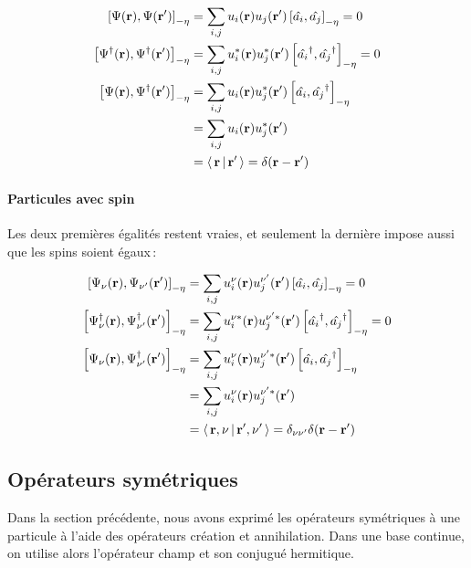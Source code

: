             \begin{align*}
                \left[\Psi(\mathbf{r}), \Psi(\mathbf{r}')\right]_{- \eta} 
                &= \sum_{i,j} u_i(\mathbf{r}) u_j(\mathbf{r}') \left[\hat{a_i}, \hat{a_j}\right]_{- \eta} = 0 \\
                \left[\Psi^{\dagger}(\mathbf{r}), \Psi^{\dagger}(\mathbf{r}')\right]_{- \eta} 
                &= \sum_{i,j} u_i^*(\mathbf{r}) u_j^*(\mathbf{r}') \left[\hat{a_i}^{\dagger}, \hat{a_j}^{\dagger}\right]_{- \eta} = 0 \\ 
                \left[\Psi(\mathbf{r}), \Psi^{\dagger}(\mathbf{r}')\right]_{- \eta} 
                &= \sum_{i,j} u_i(\mathbf{r}) u_j^*(\mathbf{r}') \left[\hat{a_i}, \hat{a_j}^{\dagger}\right]_{- \eta} \\ 
                &= \sum_{i,j} u_i(\mathbf{r}) u_j^*(\mathbf{r}') \\
                &= \left< \, \mathbf{r} \, \middle| \, \mathbf{r}' \, \right> = \delta(\mathbf{r} - \mathbf{r}') \\
            \end{align*}

            \paragraph{Particules avec spin}

            Les deux premières égalités restent vraies, et seulement la dernière impose aussi que les spins soient égaux :

            \begin{align*}
                \left[\Psi_{\nu}(\mathbf{r}), \Psi_{\nu'}(\mathbf{r}')\right]_{- \eta} 
                &= \sum_{i,j} u_i^{\nu}(\mathbf{r}) u_j^{\nu'}(\mathbf{r}') \left[\hat{a_i}, \hat{a_j}\right]_{- \eta} = 0 \\
                \left[\Psi_{\nu}^{\dagger}(\mathbf{r}), \Psi_{\nu'}^{\dagger}(\mathbf{r}')\right]_{- \eta} 
                &= \sum_{i,j} u_i^{\nu *}(\mathbf{r}) u_j^{\nu'*}(\mathbf{r}') \left[\hat{a_i}^{\dagger}, \hat{a_j}^{\dagger}\right]_{- \eta} = 0 \\ 
                \left[\Psi_{\nu}(\mathbf{r}), \Psi_{\nu'}^{\dagger}(\mathbf{r}')\right]_{- \eta} 
                &= \sum_{i,j} u_i^{\nu}(\mathbf{r}) u_j^{\nu'*}(\mathbf{r}') \left[\hat{a_i}, \hat{a_j}^{\dagger}\right]_{- \eta} \\ 
                &= \sum_{i,j} u_i^{\nu}(\mathbf{r}) u_j^{\nu'*}(\mathbf{r}') \\
                &= \left< \, \mathbf{r}, \nu \, \middle| \, \mathbf{r}', \nu' \, \right> = \delta_{\nu \nu'} \delta(\mathbf{r} - \mathbf{r}') \\
            \end{align*}

    \subsection{Opérateurs symétriques}

    Dans la section précédente, nous avons exprimé les opérateurs symétriques à une particule à l’aide des opérateurs création et annihilation. Dans une base continue, on utilise alors l’opérateur champ et son conjugué hermitique.


       
